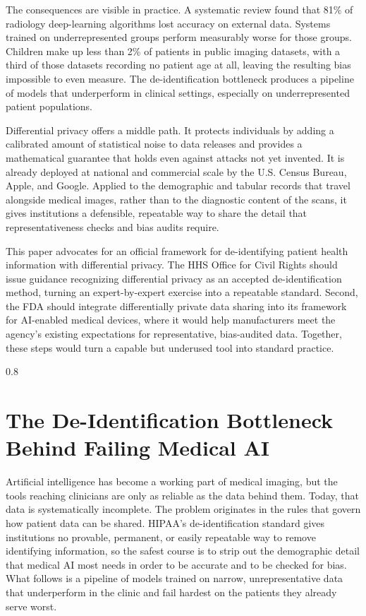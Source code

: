 \documentclass[11pt]{article}
\begin{document}
The consequences are visible in practice. A systematic review found that 81\% of radiology deep-learning algorithms lost accuracy on external data. Systems trained on underrepresented groups perform measurably worse for those groups. Children make up less than 2\% of patients in public imaging datasets, with a third of those datasets recording no patient age at all, leaving the resulting bias impossible to even measure. The de-identification bottleneck produces a pipeline of models that underperform in clinical settings, especially on underrepresented patient populations.

Differential privacy offers a middle path. It protects individuals by adding a calibrated amount of statistical noise to data releases and provides a mathematical guarantee that holds even against attacks not yet invented. It is already deployed at national and commercial scale by the U.S. Census Bureau, Apple, and Google. Applied to the demographic and tabular records that travel alongside medical images, rather than to the diagnostic content of the scans, it gives institutions a defensible, repeatable way to share the detail that representativeness checks and bias audits require.

This paper advocates for an official framework for de-identifying patient health information with differential privacy. The HHS Office for Civil Rights should issue guidance recognizing differential privacy as an accepted de-identification method, turning an expert-by-expert exercise into a repeatable standard. Second, the FDA should integrate differentially private data sharing into its framework for AI-enabled medical devices, where it would help manufacturers meet the agency's existing expectations for representative, bias-audited data. Together, these steps would turn a capable but underused tool into standard practice.
\newpage
\begingroup
\begin{spacing}{0.8}
\tableofcontents
\end{spacing}
\endgroup
\newpage

\section{The De-Identification Bottleneck Behind Failing Medical AI}

Artificial intelligence has become a working part of medical imaging, but the tools reaching clinicians are only as reliable as the data behind them. Today, that data is systematically incomplete. The problem originates in the rules that govern how patient data can be shared. HIPAA's de-identification standard gives institutions no provable, permanent, or easily repeatable way to remove identifying information, so the safest course is to strip out the demographic detail that medical AI most needs in order to be accurate and to be checked for bias. What follows is a pipeline of models trained on narrow, unrepresentative data that underperform in the clinic and fail hardest on the patients they already serve worst.
\end{document}

